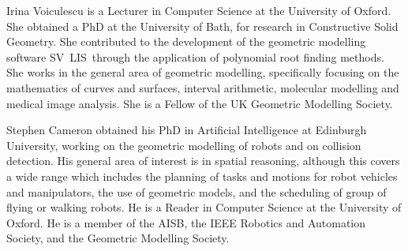 \documentclass[10pt,twocolumn,twoside]{IEEEtran}
\newcommand{\svlis}{%
\mbox{\scriptsize S\hspace{-0.2mm}\footnotesize V\hspace{-0.2mm}%
\normalsize L\hspace{0.1mm}\footnotesize I\hspace{0.2mm}\scriptsize S\ }}
\begin{document}
\begin{IEEEbiography}{Irina Voiculescu}
is a Lecturer in Computer Science at the University of Oxford. She obtained a PhD at the University of Bath, for research in Constructive Solid Geometry. She contributed to the development of the geometric modelling software \svlis through the application of polynomial root finding methods. She works in the general area of geometric modelling, specifically focusing on the mathematics of curves and surfaces, interval arithmetic, molecular modelling and medical image analysis. She is a Fellow of the UK Geometric Modelling Society.
\end{IEEEbiography}

\begin{IEEEbiography}{Stephen Cameron}
obtained his PhD in Artificial Intelligence at Edinburgh University, working on the geometric modelling of robots and on collision detection. His general area of interest is in spatial reasoning, although this covers a wide range which includes the planning of tasks and motions for robot vehicles and manipulators, the use of geometric models, and the scheduling of group of flying or walking robots. He is a Reader in Computer Science at the University of Oxford. He is a member of the AISB, the IEEE Robotics and Automation Society, and the Geometric Modelling Society.
\end{IEEEbiography}
\end{document}
